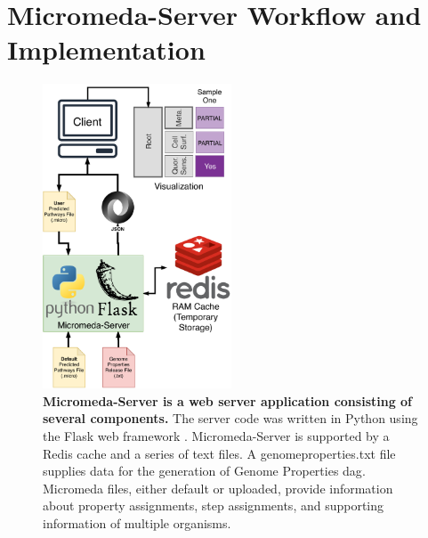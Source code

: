\section{Micromeda-Server Workflow and Implementation} \label{server-workflow}

\begin{figure}[!ht]
  \centering
	\includegraphics[width=0.50\textwidth]{media/Micromeda-Server.pdf}
	 \caption[Micromeda-Server is a web server application consisting of several components.]{\textbf{Micromeda-Server is a web server application consisting of several components.} The server code was written in Python using the Flask web framework \cite{grinberg2018flask}. Micromeda-Server is supported by a Redis cache and a series of text files. A genomeproperties.txt file supplies data for the generation of Genome Properties \gls{dag}. Micromeda files, either default or uploaded, provide information about property assignments, step assignments, and supporting information of multiple organisms.}
	 \label{fig:micromeda-server}
\end{figure}

